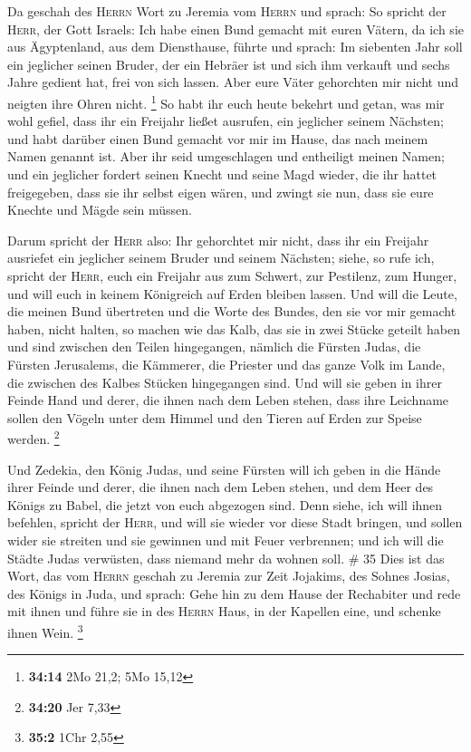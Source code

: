  Da geschah des \textsc{Herrn} Wort zu Jeremia vom
\textsc{Herrn} und sprach:  So spricht der \textsc{Herr},
der Gott Israels: Ich habe einen Bund gemacht mit euren Vätern, da ich
sie aus Ägyptenland, aus dem Diensthause, führte und sprach:
 Im siebenten Jahr soll ein jeglicher seinen Bruder, der
ein Hebräer ist und sich ihm verkauft und sechs Jahre gedient hat, frei
von sich lassen. Aber eure Väter gehorchten mir nicht und neigten ihre
Ohren nicht. \footnote{\textbf{34:14} 2Mo 21,2; 5Mo 15,12}
 So habt ihr euch heute bekehrt und getan, was mir wohl
gefiel, dass ihr ein Freijahr ließet ausrufen, ein jeglicher seinem
Nächsten; und habt darüber einen Bund gemacht vor mir im Hause, das nach
meinem Namen genannt ist.  Aber ihr seid umgeschlagen und
entheiligt meinen Namen; und ein jeglicher fordert seinen Knecht und
seine Magd wieder, die ihr hattet freigegeben, dass sie ihr selbst eigen
wären, und zwingt sie nun, dass sie eure Knechte und Mägde sein müssen.

 Darum spricht der \textsc{Herr} also: Ihr gehorchtet mir
nicht, dass ihr ein Freijahr ausriefet ein jeglicher seinem Bruder und
seinem Nächsten; siehe, so rufe ich, spricht der \textsc{Herr}, euch ein
Freijahr aus zum Schwert, zur Pestilenz, zum Hunger, und will euch in
keinem Königreich auf Erden bleiben lassen.  Und will die
Leute, die meinen Bund übertreten und die Worte des Bundes, den sie vor
mir gemacht haben, nicht halten, so machen wie das Kalb, das sie in zwei
Stücke geteilt haben und sind zwischen den Teilen hingegangen,
 nämlich die Fürsten Judas, die Fürsten Jerusalems, die
Kämmerer, die Priester und das ganze Volk im Lande, die zwischen des
Kalbes Stücken hingegangen sind.  Und will sie geben in
ihrer Feinde Hand und derer, die ihnen nach dem Leben stehen, dass ihre
Leichname sollen den Vögeln unter dem Himmel und den Tieren auf Erden
zur Speise werden. \footnote{\textbf{34:20} Jer 7,33}

 Und Zedekia, den König Judas, und seine Fürsten will ich
geben in die Hände ihrer Feinde und derer, die ihnen nach dem Leben
stehen, und dem Heer des Königs zu Babel, die jetzt von euch abgezogen
sind.  Denn siehe, ich will ihnen befehlen, spricht der
\textsc{Herr}, und will sie wieder vor diese Stadt bringen, und sollen
wider sie streiten und sie gewinnen und mit Feuer verbrennen; und ich
will die Städte Judas verwüsten, dass niemand mehr da wohnen soll. \# 35
 Dies ist das Wort, das vom \textsc{Herrn} geschah zu
Jeremia zur Zeit Jojakims, des Sohnes Josias, des Königs in Juda, und
sprach:  Gehe hin zu dem Hause der Rechabiter und rede mit
ihnen und führe sie in des \textsc{Herrn} Haus, in der Kapellen eine,
und schenke ihnen Wein. \footnote{\textbf{35:2} 1Chr 2,55}

